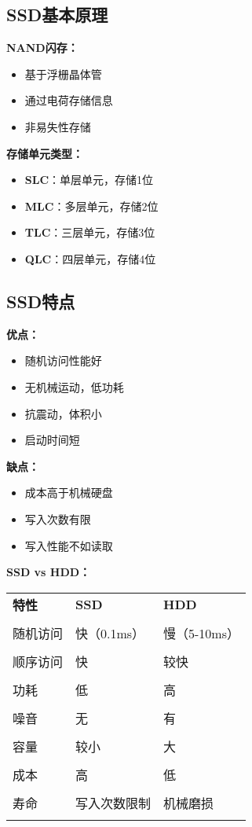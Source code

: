 \documentclass[lang=cn,newtx,10pt,scheme=chinese]{../../elegantbook}
\begin{document}
\subsection{SSD基本原理}

\textbf{NAND闪存：}
\begin{itemize}
  \item 基于浮栅晶体管
  \item 通过电荷存储信息
  \item 非易失性存储
\end{itemize}

\textbf{存储单元类型：}
\begin{itemize}
  \item \textbf{SLC}：单层单元，存储1位
  \item \textbf{MLC}：多层单元，存储2位
  \item \textbf{TLC}：三层单元，存储3位
  \item \textbf{QLC}：四层单元，存储4位
\end{itemize}

\subsection{SSD特点}

\textbf{优点：}
\begin{itemize}
  \item 随机访问性能好
  \item 无机械运动，低功耗
  \item 抗震动，体积小
  \item 启动时间短
\end{itemize}

\textbf{缺点：}
\begin{itemize}
  \item 成本高于机械硬盘
  \item 写入次数有限
  \item 写入性能不如读取
\end{itemize}

\textbf{SSD vs HDD：}
\begin{longtable}{@{}p{3cm}p{4cm}p{4cm}@{}}
\toprule
\textbf{特性} & \textbf{SSD} & \textbf{HDD} \\\\ \midrule
\endhead

随机访问 & 快（0.1ms） & 慢（5-10ms） \\\\
顺序访问 & 快 & 较快 \\\\
功耗 & 低 & 高 \\\\
噪音 & 无 & 有 \\\\
容量 & 较小 & 大 \\\\
成本 & 高 & 低 \\\\
寿命 & 写入次数限制 & 机械磨损 \\\\

\bottomrule
\end{longtable}
\end{document}
